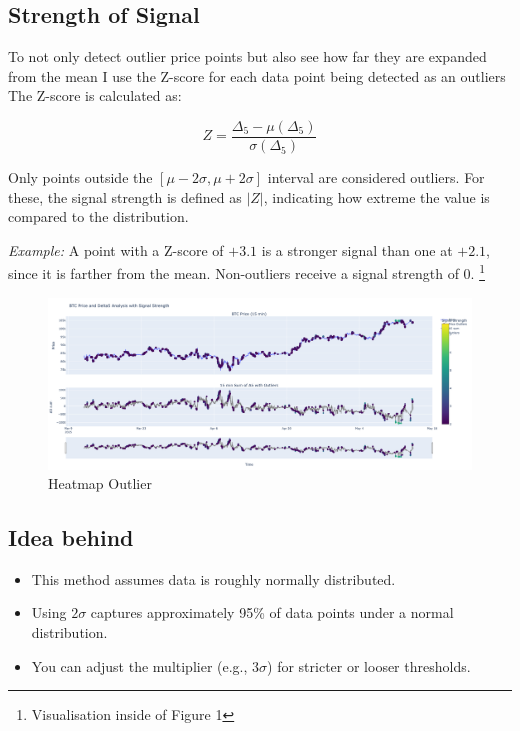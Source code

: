 \documentclass[12pt]{article}
\begin{document}
\subsection*{Strength of Signal}

To not only detect outlier price points but also see how far they are expanded from the mean I use the Z-score for each data point being detected as an outliers
\newpage
The Z-score is calculated as:

\[
Z = \frac{\Delta_5 - \mu(\Delta_5)}{\sigma(\Delta_5)}
\]

Only points outside the $[\mu - 2\sigma, \mu + 2\sigma]$ interval are considered outliers.  
For these, the signal strength is defined as $|Z|$, indicating how extreme the value is compared to the distribution.

\textit{Example:}  
A point with a Z-score of $+3.1$ is a stronger signal than one at $+2.1$, since it is farther from the mean.  
Non-outliers receive a signal strength of 0. 
\footnote{Visualisation inside of Figure 1}





\begin{figure}
    \centering
    \includegraphics[width=1\textwidth]{imgs/outlier_signal_visualised.png}
    \caption{Heatmap Outlier}
\end{figure}




\newpage


\subsection*{Idea behind}

\begin{itemize}
    \item This method assumes data is roughly normally distributed.
    \item Using $2\sigma$ captures approximately 95\% of data points under a normal distribution.
    \item You can adjust the multiplier (e.g., $3\sigma$) for stricter or looser thresholds.
\end{itemize}
\end{document}
